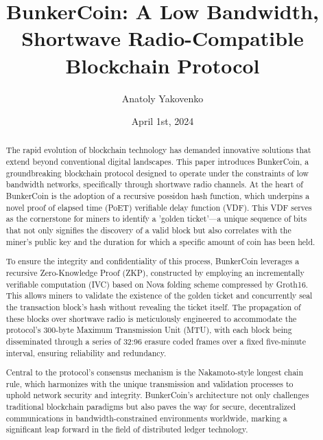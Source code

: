 \documentclass{article}
\title{BunkerCoin: A Low Bandwidth, Shortwave Radio-Compatible Blockchain Protocol}
\author{Anatoly Yakovenko}
\date{April 1st, 2024}
\begin{document}
\maketitle

\begin{abstract}
The rapid evolution of blockchain technology has demanded innovative solutions that extend beyond conventional digital landscapes. This paper introduces BunkerCoin, a groundbreaking blockchain protocol designed to operate under the constraints of low bandwidth networks, specifically through shortwave radio channels. At the heart of BunkerCoin is the adoption of a recursive possidon hash function, which underpins a novel proof of elapsed time (PoET) verifiable delay function (VDF). This VDF serves as the cornerstone for miners to identify a 'golden ticket'—a unique sequence of bits that not only signifies the discovery of a valid block but also correlates with the miner's public key and the duration for which a specific amount of coin has been held.

To ensure the integrity and confidentiality of this process, BunkerCoin leverages a recursive Zero-Knowledge Proof (ZKP), constructed by employing an incrementally verifiable computation (IVC) based on Nova folding scheme compressed by Groth16. This allows miners to validate the existence of the golden ticket and concurrently seal the transaction block's hash without revealing the ticket itself. The propagation of these blocks over shortwave radio is meticulously engineered to accommodate the protocol's 300-byte Maximum Transmission Unit (MTU), with each block being disseminated through a series of 32:96 erasure coded frames over a fixed five-minute interval, ensuring reliability and redundancy.

Central to the protocol's consensus mechanism is the Nakamoto-style longest chain rule, which harmonizes with the unique transmission and validation processes to uphold network security and integrity. BunkerCoin's architecture not only challenges traditional blockchain paradigms but also paves the way for secure, decentralized communications in bandwidth-constrained environments worldwide, marking a significant leap forward in the field of distributed ledger technology.
\end{abstract}
\end{document}
